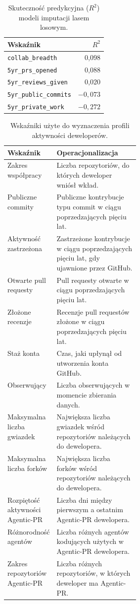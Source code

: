 \begin{table}[H]
    \centering
    \caption{Skuteczność predykcyjna ($R^2$) modeli imputacji lasem losowym.}
    \label{tab:r2-values}
    \small
    \begin{tabular}{lr}
        \toprule
        \textbf{Wskaźnik} & \textbf{$R^2$} \\
        \midrule
        \texttt{collab\_breadth} & 0,098 \\
        \texttt{5yr\_prs\_opened} & 0,088 \\
        \texttt{5yr\_reviews\_given} & 0,020 \\
        \texttt{5yr\_public\_commits} & $-0{,}073$ \\
        \texttt{5yr\_private\_work} & $-0{,}272$ \\
        \bottomrule
    \end{tabular}
\end{table}
\begin{table}[H]
    \centering
    \caption{Wskaźniki użyte do wyznaczenia profili aktywności deweloperów.}
    \label{tab:profile-indicators}
    \small
    \begin{tabularx}{\linewidth}{@{}p{0.31\linewidth}X@{}}
        \toprule
        \textbf{Wskaźnik} & \textbf{Operacjonalizacja} \\
        \midrule
        Zakres współpracy & Liczba repozytoriów, do których deweloper wniósł wkład. \\
        Publiczne commity & Publiczne kontrybucje typu commit w ciągu poprzedzających pięciu lat. \\
        Aktywność zastrzeżona & Zastrzeżone kontrybucje w ciągu poprzedzających pięciu lat, gdy ujawnione przez GitHub. \\
        Otwarte pull requesty & Pull requesty otwarte w ciągu poprzedzających pięciu lat. \\
        Złożone recenzje & Recenzje pull requestów złożone w ciągu poprzedzających pięciu lat. \\
        Staż konta & Czas, jaki upłynął od utworzenia konta GitHub. \\
        Obserwujący & Liczba obserwujących w momencie zbierania danych. \\
        Maksymalna liczba gwiazdek & Największa liczba gwiazdek wśród repozytoriów należących do dewelopera. \\
        Maksymalna liczba forków & Największa liczba forków wśród repozytoriów należących do dewelopera. \\
        Rozpiętość aktywności Agentic-PR & Liczba dni między pierwszym a ostatnim Agentic-PR dewelopera. \\
        Różnorodność agentów & Liczba różnych agentów kodujących użytych w Agentic-PR dewelopera. \\
        Zakres repozytoriów Agentic-PR & Liczba różnych repozytoriów, w których deweloper ma Agentic-PR. \\
        \bottomrule
    \end{tabularx}
\end{table}

